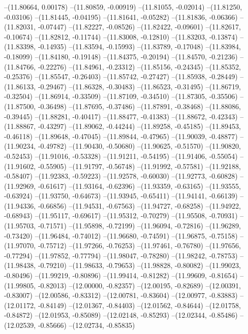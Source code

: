 --(11.80664, 0.00178)
--(11.80859, -0.00919)
--(11.81055, -0.02014)
--(11.81250, -0.03106)
--(11.81445, -0.04195)
--(11.81641, -0.05282)
--(11.81836, -0.06366)
--(11.82031, -0.07447)
--(11.82227, -0.08526)
--(11.82422, -0.09601)
--(11.82617, -0.10674)
--(11.82812, -0.11744)
--(11.83008, -0.12810)
--(11.83203, -0.13874)
--(11.83398, -0.14935)
--(11.83594, -0.15993)
--(11.83789, -0.17048)
--(11.83984, -0.18099)
--(11.84180, -0.19148)
--(11.84375, -0.20194)
--(11.84570, -0.21236)
--(11.84766, -0.22276)
--(11.84961, -0.23312)
--(11.85156, -0.24345)
--(11.85352, -0.25376)
--(11.85547, -0.26403)
--(11.85742, -0.27427)
--(11.85938, -0.28449)
--(11.86133, -0.29467)
--(11.86328, -0.30483)
--(11.86523, -0.31495)
--(11.86719, -0.32504)
--(11.86914, -0.33509)
--(11.87109, -0.34510)
--(11.87305, -0.35506)
--(11.87500, -0.36498)
--(11.87695, -0.37486)
--(11.87891, -0.38468)
--(11.88086, -0.39445)
--(11.88281, -0.40417)
--(11.88477, -0.41383)
--(11.88672, -0.42343)
--(11.88867, -0.43297)
--(11.89062, -0.44244)
--(11.89258, -0.45185)
--(11.89453, -0.46118)
--(11.89648, -0.47045)
--(11.89844, -0.47965)
--(11.90039, -0.48877)
--(11.90234, -0.49782)
--(11.90430, -0.50680)
--(11.90625, -0.51570)
--(11.90820, -0.52453)
--(11.91016, -0.53328)
--(11.91211, -0.54195)
--(11.91406, -0.55054)
--(11.91602, -0.55905)
--(11.91797, -0.56748)
--(11.91992, -0.57581)
--(11.92188, -0.58407)
--(11.92383, -0.59223)
--(11.92578, -0.60030)
--(11.92773, -0.60828)
--(11.92969, -0.61617)
--(11.93164, -0.62396)
--(11.93359, -0.63165)
--(11.93555, -0.63924)
--(11.93750, -0.64673)
--(11.93945, -0.65411)
--(11.94141, -0.66139)
--(11.94336, -0.66856)
--(11.94531, -0.67563)
--(11.94727, -0.68258)
--(11.94922, -0.68943)
--(11.95117, -0.69617)
--(11.95312, -0.70279)
--(11.95508, -0.70931)
--(11.95703, -0.71571)
--(11.95898, -0.72199)
--(11.96094, -0.72816)
--(11.96289, -0.73420)
--(11.96484, -0.74012)
--(11.96680, -0.74591)
--(11.96875, -0.75158)
--(11.97070, -0.75712)
--(11.97266, -0.76253)
--(11.97461, -0.76780)
--(11.97656, -0.77294)
--(11.97852, -0.77794)
--(11.98047, -0.78280)
--(11.98242, -0.78753)
--(11.98438, -0.79210)
--(11.98633, -0.79653)
--(11.98828, -0.80082)
--(11.99023, -0.80496)
--(11.99219, -0.80896)
--(11.99414, -0.81282)
--(11.99609, -0.81654)
--(11.99805, -0.82013)
--(12.00000, -0.82357)
--(12.00195, -0.82689)
--(12.00391, -0.83007)
--(12.00586, -0.83312)
--(12.00781, -0.83604)
--(12.00977, -0.83883)
--(12.01172, -0.84149)
--(12.01367, -0.84403)
--(12.01562, -0.84644)
--(12.01758, -0.84872)
--(12.01953, -0.85089)
--(12.02148, -0.85293)
--(12.02344, -0.85486)
--(12.02539, -0.85666)
--(12.02734, -0.85835)
